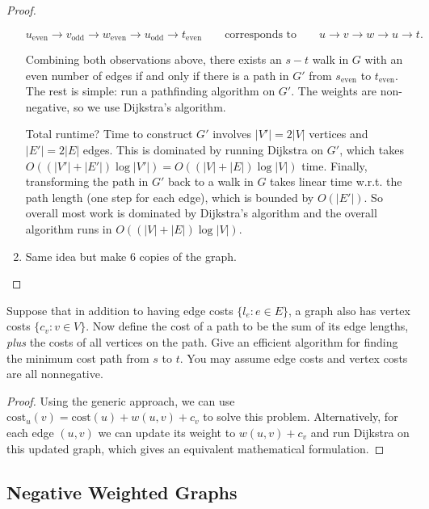 \begin{proof}
\begin{enumerate}
      \[u_\text{even} \to v_\text{odd} \to w_\text{even} \to u_{\text{odd}} \to t_\text{even} \qquad \text{corresponds to}\qquad u\to v\to w \to u\to t.\]

      Combining both observations above, there exists an $s-t$ walk in $G$ with an even number of edges if and only if there is a path in $G'$ from $s_\text{even}$ to $t_\text{even}$. The rest is simple: run a pathfinding algorithm on $G'$. The weights are non-negative, so we use Dijkstra's algorithm. 

      Total runtime? Time to construct $G'$ involves $\lvert V'\rvert = 2\lvert V\lvert$ vertices and $\lvert E'\rvert = 2\lvert E\rvert$ edges. This is dominated by running Dijkstra on $G'$, which takes $O((|V'| +\lvert E'\rvert )\log \lvert V'\rvert) = O((|V|+\lvert E\rvert)\log \lvert V\rvert)$ time. Finally, transforming the path in $G'$ back to a walk in $G$ takes linear time w.r.t. the path length (one step for each edge), which is bounded by $O(\lvert E'\rvert)$.  So overall most work is dominated by Dijkstra's algorithm and the overall algorithm runs in $O((|V|+\lvert E\rvert) \log \lvert V\rvert)$.

      \item Same idea but make 6 copies of the graph. 
    \end{enumerate}
  \end{proof}

  \begin{exercise}
    Suppose that in addition to having edge costs $\{l_e:e\in E\}$, a graph also has vertex costs $\{c_v:v\in V\}$. Now define the cost of a path to be the sum of its edge lengths, \textit{plus} the costs of all vertices on the path. Give an efficient algorithm for finding the minimum cost path from $s$ to $t$. You may assume edge costs and vertex costs are all nonnegative.
  \end{exercise}
  \begin{proof}
    Using the generic approach, we can use $\text{cost}_u(v)=\text{cost}(u)+w(u,v)+c_v$ to solve this problem. Alternatively, for each edge $(u,v)$ we can update its weight to $w(u,v)+c_v$ and run Dijkstra on this updated graph, which gives an equivalent mathematical formulation.
  \end{proof}

\subsection{Negative Weighted Graphs} 

